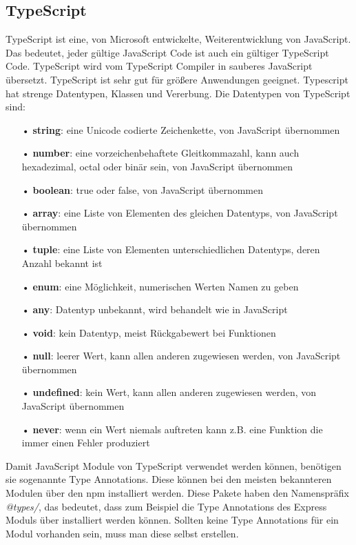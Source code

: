 \subsection{TypeScript}
\label{sec:vor-ts}
TypeScript ist eine, von Microsoft entwickelte, Weiterentwicklung von JavaScript. Das bedeutet, jeder gültige JavaScript Code ist auch ein gültiger TypeScript Code. TypeScript wird vom TypeScript Compiler in sauberes JavaScript übersetzt. TypeScript ist sehr gut für größere Anwendungen geeignet. Typescript hat strenge Datentypen, Klassen und Vererbung. Die Datentypen von TypeScript sind:

\begin{itemize}
\item[•] \textbf{string}: eine Unicode codierte Zeichenkette, von JavaScript übernommen
\item[•] \textbf{number}: eine vorzeichenbehaftete Gleitkommazahl, kann auch hexadezimal, octal oder binär sein, von JavaScript übernommen
\item[•] \textbf{boolean}: true oder false, von JavaScript übernommen
\item[•] \textbf{array}: eine Liste von Elementen des gleichen Datentyps, von JavaScript übernommen
\item[•] \textbf{tuple}: eine Liste von Elementen unterschiedlichen Datentyps, deren Anzahl bekannt ist
\item[•] \textbf{enum}: eine Möglichkeit, numerischen Werten Namen zu geben
\item[•] \textbf{any}: Datentyp unbekannt, wird behandelt wie in JavaScript
\item[•] \textbf{void}: kein Datentyp, meist Rückgabewert bei Funktionen
\item[•] \textbf{null}: leerer Wert, kann allen anderen zugewiesen werden, von JavaScript übernommen
\item[•] \textbf{undefined}: kein Wert, kann allen anderen zugewiesen werden, von JavaScript übernommen
\item[•] \textbf{never}: wenn ein Wert niemals auftreten kann z.B. eine Funktion die immer einen Fehler produziert
\end{itemize}

Damit JavaScript Module von TypeScript verwendet werden können, benötigen sie sogenannte Type Annotations. Diese können bei den meisten bekannteren Modulen über den \ac{npm} installiert werden. Diese Pakete haben den Namenspräfix \textit{@types/}, das bedeutet, dass zum Beispiel die Type Annotations des Express Moduls über  installiert werden können. Sollten keine Type Annotations für ein Modul vorhanden sein, muss man diese selbst erstellen.

